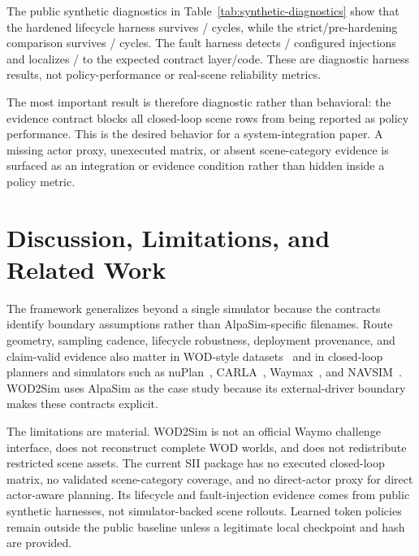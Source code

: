 \documentclass[conference,a4paper]{IEEEtran}
\begin{document}
\begin{table}[t]
\centering
\caption{Public synthetic diagnostics. These rows exercise service-level harnesses only; they are not closed-loop scene rollouts.}
\label{tab:synthetic-diagnostics}
\resizebox{\columnwidth}{!}{}
\end{table}

The public synthetic diagnostics in Table~\ref{tab:synthetic-diagnostics} show that the
hardened lifecycle harness survives \SIILifecycleFullSurvived{}/\SIILifecycleFullTotal{}
cycles, while the strict/pre-hardening comparison survives
\SIILifecycleStrictSurvived{}/\SIILifecycleStrictTotal{} cycles. The fault harness
detects \SIIFaultDetected{}/\SIIFaultTotal{} configured injections and localizes
\SIIFaultLocalized{}/\SIIFaultTotal{} to the expected contract layer/code. These are
diagnostic harness results, not policy-performance or real-scene reliability metrics.

The most important result is therefore diagnostic rather than behavioral: the evidence
contract blocks all closed-loop scene rows from being reported as policy performance.
This is the desired behavior for a system-integration paper. A missing actor proxy,
unexecuted matrix, or absent scene-category evidence is surfaced as an integration or
evidence condition rather than hidden inside a policy metric.

\section{Discussion, Limitations, and Related Work}

The framework generalizes beyond a single simulator because the contracts identify
boundary assumptions rather than AlpaSim-specific filenames. Route geometry, sampling
cadence, lifecycle robustness, deployment provenance, and claim-valid evidence also
matter in WOD-style datasets~\cite{sun2020scalability} and in closed-loop planners and
simulators such as nuPlan~\cite{caesar2021nuplan}, CARLA~\cite{dosovitskiy2017carla},
Waymax~\cite{gulino2023waymax}, and NAVSIM~\cite{dauner2024navsim}. WOD2Sim uses
AlpaSim as the case study because its external-driver boundary makes these contracts
explicit.

The limitations are material. WOD2Sim is not an official Waymo challenge interface, does
not reconstruct complete WOD worlds, and does not redistribute restricted scene assets.
The current SII package has no executed closed-loop matrix, no validated scene-category
coverage, and no direct-actor proxy for direct actor-aware planning. Its lifecycle and
fault-injection evidence comes from public synthetic harnesses, not simulator-backed
scene rollouts. Learned token policies remain outside the public baseline unless a
legitimate local checkpoint and hash are provided.
\end{document}
